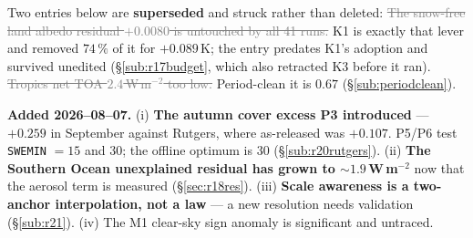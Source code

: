 \documentclass[10pt]{article}
\newcommand{\dead}[1]{\textcolor{gray}{\sout{#1}}}
\begin{document}
Two entries below are \textbf{superseded} and struck rather than deleted:
\dead{The snow-free land albedo residual $+0.0080$ is untouched by all 41 runs.} K1 is
exactly that lever and removed $74\,\%$ of it for $+0.089$\,K; the entry predates K1's
adoption and survived unedited (\S\ref{sub:r17budget}, which also retracted K3 before it
ran). \dead{Tropics net TOA $2.4$\,W\,m$^{-2}$ too low.} Period-clean it is $0.67$
(\S\ref{sub:periodclean}).

\textbf{Added 2026--08--07.} (i) \textbf{The autumn cover excess P3 introduced} ---
$+0.259$ in September against Rutgers, where as-released was $+0.107$. P5/P6 test
\texttt{SWEMIN} $=15$ and $30$; the offline optimum is 30 (\S\ref{sub:r20rutgers}).
(ii) \textbf{The Southern Ocean unexplained residual has grown to ${\sim}1.9$\,W\,m$^{-2}$}
now that the aerosol term is measured (\S\ref{sec:r18res}). (iii) \textbf{Scale awareness
is a two-anchor interpolation, not a law} --- a new resolution needs validation
(\S\ref{sub:r21}). (iv) The M1 clear-sky sign anomaly is significant and untraced.
\end{document}
